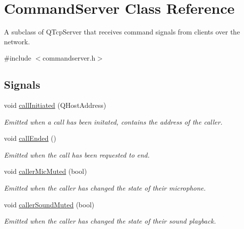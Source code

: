 \hypertarget{class_command_server}{
\section{\-Command\-Server \-Class \-Reference}
\label{class_command_server}
}


\-A subclass of \-Q\-Tcp\-Server that receives command signals from clients over the network.  




{\ttfamily \#include $<$commandserver.\-h$>$}

\subsection*{\-Signals}
\begin{DoxyCompactItemize}
\item 
void \hyperlink{class_command_server_aa7fa62273e4e4ceb87d1b77ba9681719}{call\-Initiated} (\-Q\-Host\-Address)
\begin{DoxyCompactList}\small\item\em \-Emitted when a call has been initated, contains the address of the caller. \end{DoxyCompactList}\item 
void \hyperlink{class_command_server_a17167b801328d51543128b5a80a39dcc}{call\-Ended} ()
\begin{DoxyCompactList}\small\item\em \-Emitted when the call has been requested to end. \end{DoxyCompactList}\item 
void \hyperlink{class_command_server_ae47dfe7ef7190b1f869c20736b10a6d0}{caller\-Mic\-Muted} (bool)
\begin{DoxyCompactList}\small\item\em \-Emitted when the caller has changed the state of their microphone. \end{DoxyCompactList}\item 
void \hyperlink{class_command_server_a3b7620cfee623cb8b2e9c7c468a36972}{caller\-Sound\-Muted} (bool)
\begin{DoxyCompactList}\small\item\em \-Emitted when the caller has changed the state of their sound playback. \end{DoxyCompactList}\end{DoxyCompactItemize}
